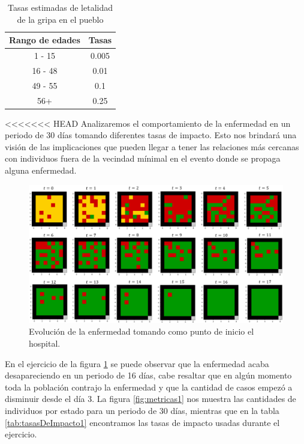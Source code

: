 \begin{table}[h]
\begin{center}
\begin{tabular}{| c | c |}
\hline
Rango de edades & Tasas \\ \hline
1 - 15 & 0.005 \\
16 - 48 & 0.01 \\
49 - 55 & 0.1 \\
56+ & 0.25 \\\hline
\end{tabular}
\caption{Tasas estimadas de letalidad de la gripa en el pueblo}
\end{center}
\end{table}

<<<<<<< HEAD
Analizaremos el comportamiento de la enfermedad en un periodo de 30 días tomando diferentes tasas de impacto. Esto nos brindará una visión de las implicaciones que pueden llegar a tener las relaciones más cercanas con individuos fuera de la vecindad mínimal en el evento donde se propaga alguna enfermedad.

\begin{figure}[h]
  \centering
    \includegraphics[width=1\textwidth]{Imagenes/evo1.PNG}
    \caption{Evolución de la enfermedad tomando como punto de inicio el hospital.}
    \label{fig:evo1}
\end{figure}

En el ejercicio de la figura \ref{fig:evo1} se puede observar que la enfermedad acaba desapareciendo en un periodo de 16 días, cabe resaltar que en algún momento toda la población contrajo la enfermedad y que la cantidad de casos empezó a disminuir desde el día 3. La figura \ref{fig:metricas1} nos muestra las cantidades de individuos por estado para un periodo de 30 días, mientras que en la tabla \ref{tab:tasasDeImpacto1} encontramos las tasas de impacto usadas durante el ejercicio.


